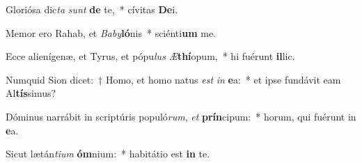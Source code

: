 \item Gloriósa dic\textit{ta} \textit{sunt} \textbf{de} te,~* cívitas \textbf{De}i.
\item Memor ero Rahab, et \textit{Ba}\textit{by}\textbf{ló}nis~* sciénti\textbf{um} me.
\item Ecce alienígenæ, et Tyrus, et pópu\textit{lus} \textit{Æ}\textbf{thí}opum,~* hi fuérunt \textbf{il}lic.
\item Numquid Sion dicet:~† Homo, et homo natus \textit{est} \textit{in} \textbf{e}a:~* et ipse fundávit eam Al\textbf{tís}simus?
\item Dóminus narrábit in scriptúris populó\textit{rum}, \textit{et} \textbf{prín}cipum:~* horum, qui fuérunt in \textbf{e}a.
\item Sicut lætán\textit{ti}\textit{um} \textbf{óm}nium:~* habitátio est \textbf{in} te.
